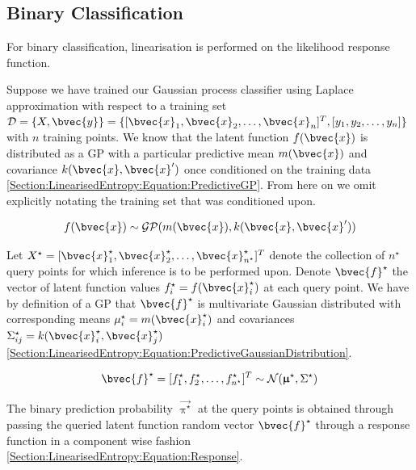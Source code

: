 		\subsection{Binary Classification}
	
			For binary classification, linearisation is performed on the likelihood response function.
		
			Suppose we have trained our Gaussian process classifier using Laplace approximation with respect to a training set $\mathcal{D} = \{X, \bvec{y}\} = \{[ \bvec{x}_{1}, \bvec{x}_{2}, \dots, \bvec{x}_{n}]^{T}, [y_{1}, y_{2}, \dots, y_{n}]\}$ with $n$ training points. We know that the latent function $f(\bvec{x})$ is distributed as a GP with a particular predictive mean $m(\bvec{x})$ and covariance $k(\bvec{x}, \bvec{x}')$ once conditioned on the training data \eqref{Section:LinearisedEntropy:Equation:PredictiveGP}. From here on we omit explicitly notating the training set that was conditioned upon.
			
			\begin{equation}
				f(\bvec{x}) \sim \mathcal{GP}(m(\bvec{x}), k(\bvec{x}, \bvec{x}'))
			\label{Section:LinearisedEntropy:Equation:PredictiveGP}
			\end{equation}
			
			Let $X^{\star} = [ \bvec{x}^{\star}_{1}, \bvec{x}^{\star}_{2}, \dots, \bvec{x}^{\star}_{n^{\star}}]^{T}$ denote the collection of $n^{\star}$ query points for which inference is to be performed upon. Denote $\bvec{f}^{\star}$ the vector of latent function values $f^{\star}_{i} = f(\bvec{x}^{\star}_{i})$ at each query point. We have by definition of a GP that $\bvec{f}^{\star}$ is multivariate Gaussian distributed with corresponding means $\mu^{\star}_{i} = m(\bvec{x}^{\star}_{i})$ and covariances $\Sigma^{\star}_{ij} = k(\bvec{x}^{\star}_{i}, \bvec{x}^{\star}_{j})$ \eqref{Section:LinearisedEntropy:Equation:PredictiveGaussianDistribution}.
			
			\begin{equation}
				\bvec{f}^{\star} = [f^{\star}_{1}, f^{\star}_{2}, \dots, f^{\star}_{n^{\star}}]^{T} \sim \mathcal{N}(\vec{\upmu}^{\star}, \Sigma^{\star})
			\label{Section:LinearisedEntropy:Equation:PredictiveGaussianDistribution}
			\end{equation}
				
			The binary prediction probability $\vec{\uppi^{\star}}$ at the query points is obtained through passing the queried latent function random vector $\bvec{f}^{\star}$ through a response function in a component wise fashion \eqref{Section:LinearisedEntropy:Equation:Response}.
			
